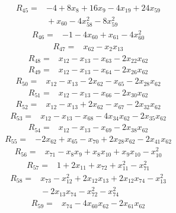\documentclass[11pt]{article}
\theoremstyle{definition}
\theoremstyle{remark}
\begin{document}
\begin{align*}
R_{45} ={}& -4 + 8x_{8} + 16x_{9} - 4x_{19} + 24x_{59} \\
&{} + x_{60} - 4x_{58}^{2} - 8x_{59}^{2}
\end{align*}
\begin{align*}
R_{46} ={}& -1 - 4x_{60} + x_{61} - 4x_{60}^{2}
\end{align*}
\begin{align*}
R_{47} ={}& x_{62} - x_{2} x_{13}
\end{align*}
\begin{align*}
R_{48} ={}& x_{12} - x_{13} - x_{63} - 2x_{22} x_{62}
\end{align*}
\begin{align*}
R_{49} ={}& x_{12} - x_{13} - x_{64} - 2x_{26} x_{62}
\end{align*}
\begin{align*}
R_{50} ={}& x_{12} - x_{13} - 2x_{62} - x_{65} - 2x_{28} x_{62}
\end{align*}
\begin{align*}
R_{51} ={}& x_{12} - x_{13} - x_{66} - 2x_{30} x_{62}
\end{align*}
\begin{align*}
R_{52} ={}& x_{12} - x_{13} + 2x_{62} - x_{67} - 2x_{32} x_{62}
\end{align*}
\begin{align*}
R_{53} ={}& x_{12} - x_{13} - x_{68} - 4x_{34} x_{62} - 2x_{35} x_{62}
\end{align*}
\begin{align*}
R_{54} ={}& x_{12} - x_{13} - x_{69} - 2x_{38} x_{62}
\end{align*}
\begin{align*}
R_{55} ={}& -2x_{62} + x_{65} - x_{70} + 2x_{28} x_{62} - 2x_{41} x_{62}
\end{align*}
\begin{align*}
R_{56} ={}& x_{71} - x_{8} x_{9} + x_{8} x_{10} + x_{9} x_{10} - x_{10}^{2}
\end{align*}
\begin{align*}
R_{57} ={}& 1 + 2x_{11} + x_{72} + x_{11}^{2} - x_{71}^{2}
\end{align*}
\begin{align*}
R_{58} ={}& x_{73} - x_{12}^{2} + 2x_{12} x_{13} + 2x_{12} x_{74} - x_{13}^{2} \\
&{} -2x_{13} x_{74} - x_{72}^{2} - x_{74}^{2}
\end{align*}
\begin{align*}
R_{59} ={}& x_{74} - 4x_{60} x_{62} - 2x_{61} x_{62}
\end{align*}
\end{document}
